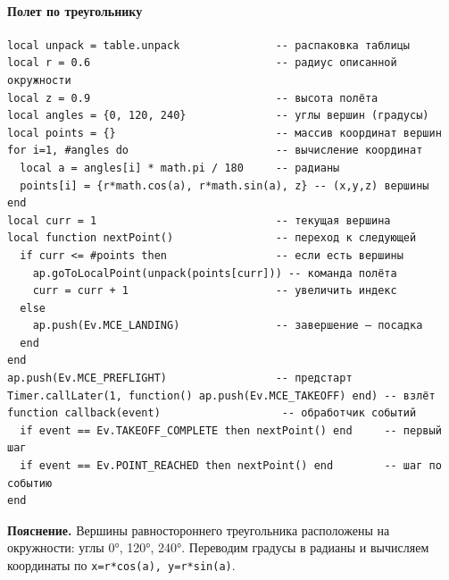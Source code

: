 \paragraph{Полет по треугольнику}
\begin{verbatim}
local unpack = table.unpack               -- распаковка таблицы
local r = 0.6                             -- радиус описанной окружности
local z = 0.9                             -- высота полёта
local angles = {0, 120, 240}              -- углы вершин (градусы)
local points = {}                         -- массив координат вершин
for i=1, #angles do                       -- вычисление координат
  local a = angles[i] * math.pi / 180     -- радианы
  points[i] = {r*math.cos(a), r*math.sin(a), z} -- (x,y,z) вершины
end
local curr = 1                            -- текущая вершина
local function nextPoint()                -- переход к следующей
  if curr <= #points then                 -- если есть вершины
    ap.goToLocalPoint(unpack(points[curr])) -- команда полёта
    curr = curr + 1                       -- увеличить индекс
  else
    ap.push(Ev.MCE_LANDING)               -- завершение — посадка
  end
end
ap.push(Ev.MCE_PREFLIGHT)                 -- предстарт
Timer.callLater(1, function() ap.push(Ev.MCE_TAKEOFF) end) -- взлёт
function callback(event)                   -- обработчик событий
  if event == Ev.TAKEOFF_COMPLETE then nextPoint() end     -- первый шаг
  if event == Ev.POINT_REACHED then nextPoint() end        -- шаг по событию
end
\end{verbatim}
\textbf{Пояснение.} Вершины равностороннего треугольника расположены на окружности: углы 0°, 120°, 240°. Переводим градусы в радианы и вычисляем координаты по \texttt{x=r*cos(a), y=r*sin(a)}.

